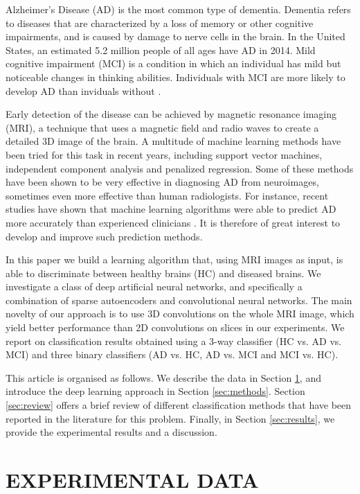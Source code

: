 \documentclass[a4paper,10pt]{article}
\begin{document}
\noindent Alzheimer's Disease (AD) is the most common type of dementia. Dementia refers to diseases that are characterized by a loss of memory or other cognitive impairments, and is caused by damage to nerve cells in the brain. In the United States, an estimated 5.2 million people of all ages have AD in 2014. Mild cognitive impairment (MCI) is a condition in which an individual has mild but noticeable changes in thinking abilities. Individuals with MCI are more likely to develop AD than inviduals without \cite{AD}.

Early detection of the disease can be achieved by magnetic resonance imaging (MRI), a technique that uses a magnetic field and radio waves to create a detailed 3D image of the brain. A multitude of machine learning methods have been tried for this task in recent years, including support vector machines, independent component analysis and penalized regression. Some of these methods have been shown to be very effective in diagnosing AD from neuroimages, sometimes even more effective than human radiologists. For instance, recent studies have shown that machine learning algorithms were able to predict AD more accurately than experienced clinicians \cite{kloppel}. It is therefore of great interest to
develop and improve such prediction methods.

In this paper we build a learning algorithm that, using MRI images as input, is able to discriminate between healthy brains (HC) and diseased brains. We investigate a class of deep artificial neural networks, and specifically a combination of sparse autoencoders and convolutional neural networks. The main novelty of our approach is to use 3D convolutions on the whole MRI image, which yield better performance than 2D convolutions on slices in our experiments. We report on classification results obtained using a 3-way classifier (HC vs. AD vs. MCI) and three binary classifiers (AD vs. HC, AD vs. MCI and MCI vs. HC).

This article is organised as follows. We describe the data in Section \ref{sec:data}, and introduce the deep learning approach in Section \ref{sec:methods}. Section \ref{sec:review} offers a brief review of different classification methods that have been reported in the literature for this problem. Finally, in Section \ref{sec:results}, we provide the experimental results and a discussion.

\section{\uppercase{Experimental Data}}\label{sec:data}
\end{document}
